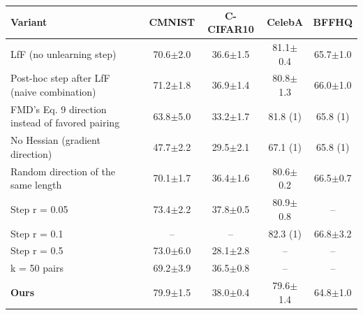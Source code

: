\begin{tabular}{lcccc}
\toprule
Variant & CMNIST & C-CIFAR10 & CelebA & BFFHQ \\
\midrule
LfF (no unlearning step) & 70.6{\scriptsize$\pm$2.0} & 36.6{\scriptsize$\pm$1.5} & 81.1{\scriptsize$\pm$0.4} & 65.7{\scriptsize$\pm$1.0} \\
Post-hoc step after LfF (naive combination) & 71.2{\scriptsize$\pm$1.8} & 36.9{\scriptsize$\pm$1.4} & 80.8{\scriptsize$\pm$1.3} & 66.0{\scriptsize$\pm$1.0} \\
FMD's Eq. 9 direction instead of favored pairing & 63.8{\scriptsize$\pm$5.0} & 33.2{\scriptsize$\pm$1.7} & 81.8 (1) & 65.8 (1) \\
No Hessian (gradient direction) & 47.7{\scriptsize$\pm$2.2} & 29.5{\scriptsize$\pm$2.1} & 67.1 (1) & 65.8 (1) \\
Random direction of the same length & 70.1{\scriptsize$\pm$1.7} & 36.4{\scriptsize$\pm$1.6} & 80.6{\scriptsize$\pm$0.2} & 66.5{\scriptsize$\pm$0.7} \\
Step r = 0.05 & 73.4{\scriptsize$\pm$2.2} & 37.8{\scriptsize$\pm$0.5} & 80.9{\scriptsize$\pm$0.8} & – \\
Step r = 0.1 & – & – & 82.3 (1) & 66.8{\scriptsize$\pm$3.2} \\
Step r = 0.5 & 73.0{\scriptsize$\pm$6.0} & 28.1{\scriptsize$\pm$2.8} & – & – \\
k = 50 pairs & 69.2{\scriptsize$\pm$3.9} & 36.5{\scriptsize$\pm$0.8} & – & – \\
\textbf{Ours} & 79.9{\scriptsize$\pm$1.5} & 38.0{\scriptsize$\pm$0.4} & 79.6{\scriptsize$\pm$1.4} & 64.8{\scriptsize$\pm$1.0} \\
\bottomrule
\end{tabular}
